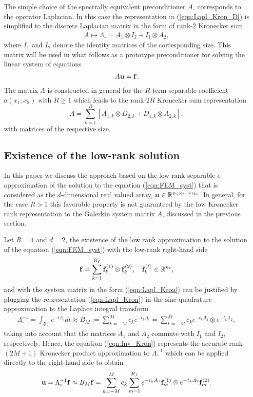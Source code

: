 \documentclass[amstex,amstext,amsfonts,epsf,12pt] {amsart}
\newcommand{\cred}{\color{red}}
\newcommand{\cn}{\color{black}}
\newcommand\ben{\begin{eqnarray}}
\newcommand\een{\end{eqnarray}}
\def\ben{\begin{eqnarray}}
\def\een{\end{eqnarray}}
\begin{document}
The simple choice of the spectrally equivalent preconditioner $A_\circ$ 
corresponds to the operator Laplacian. In this case 
the representation in (\ref{eqn:Lapl_Kron_D}) is simplified 
 to the discrete Laplacian matrix in the form of rank-$2$ Kronecker sum
\ben \label{eqn:Lapl_Kron}
 {A} \mapsto \Lambda_\circ = A_1 \otimes I_2 + I_1 \otimes A_2,
\een
where $I_1$ and $I_2$ denote the identity matrices of the corresponding size.
This matrix will be used in what follows as a prototype preconditioner for solving
the linear system of equations 
\ben \label{eqn:FEM_syst}
 A {\bf u} = {\bf f}.
\een
The matrix $A$ is constructed in general for the $R$-term separable coefficient 
$a(x_1,x_2)$ with $R\geq1$ which leads to the rank-$2R$ Kronecker sum representation
\[
  A = \sum\limits^{R}_{k=1} [A_{1,k} \otimes D_{2,k} + D_{1,k} \otimes A_{2,k}],
\]
with matrices of the respective size.



\subsection{Existence of the low-rank solution}\label{ssec:LowRankSolut}

In this paper we discuss the approach based on the low rank
separable $\epsilon$-approximation of the solution to the equation (\ref{eqn:FEM_syst})
that is considered as the $d$-dimensional real valued array, 
${\bf u}\in \mathbb{R}^{n_1\times \cdots \times n_d}$. 
In general, for the case $R>1$ this favorable property is not guaranteed by the low Kronecker rank
representation to the Galerkin system matrix $A$, discussed in the previous section.

Let $R=1$ and $d=2$, the existence of the low rank approximation  
to the solution of the equation (\ref{eqn:FEM_syst}) with the low-rank right-hand side 
\[
 {\bf f}=\sum\limits^{R_f}_{k=1} {\bf f}^{(1)}_k \otimes {\bf f}^{(2)}_k,  \quad 
 {\bf f}^{(\ell)}_k\in \mathbb{R}^{n_\ell},
\]
and with the system matrix in the form (\ref{eqn:Lapl_Kron}) 
can be justified by plugging the representation (\ref{eqn:Lapl_Kron}) 
in the $\mbox{sinc}$-quadrature approximation to the Laplace integral transform \cite{GaHaKh4:02} 
\ben \label{eqn:Inv_Kron}
 \Lambda_\circ^{-1}=\int_{\mathbb{R}_+} e^{- t \Lambda_\circ } dt
 \approx B_M:=\sum\limits_{k=-M}^M c_k e^{-t_k \Lambda_\circ }=
 \sum\limits_{k=-M}^M c_k e^{-t_k A_1 } \otimes e^{-t_k A_2 },
\een
taking into account that the matrices $A_1$ and  $A_2$ commute with $I_1$ and $I_2$, respectively.
Hence, the equation (\ref{eqn:Inv_Kron}) represents the accurate rank-$(2M+1)$ Kronecker 
product approximation to $\Lambda_\circ^{-1}$
which can be applied directly to the right-hand side to obtain
\[
 {\bf u} = \Lambda_\circ^{-1}{\bf f} \approx B_M {\bf f} =
 \sum\limits_{k=-M}^M c_k \sum\limits^{R_f}_{m=1} 
 e^{-t_k A_1 }{\bf f}^{(1)}_m \otimes e^{-t_k A_2 }{\bf f}^{(2)}_m.
\]
\end{document}
